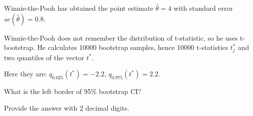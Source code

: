 
\begin{question}
Winnie-the-Pooh has obtained the point estimate \(\hat\theta = 4\)
with standard error \(se(\hat\theta)= 0.8\).

Winnie-the-Pooh does not remember the distribution of t-statistic,
so he uses t-bootstrap.
He calculates 10000 bootstrap samples, hence 10000 t-statistics \(t^*_j\) and
two quantiles of the vector \(t^*\).

Here they are: \(q_{0.025}(t^*) = -2.2\), \(q_{0.975}(t^*)= 2.2\).

What is the left border of 95\% bootstrap CI?

Provide the answer with 2 decimal digits.
\end{question}


